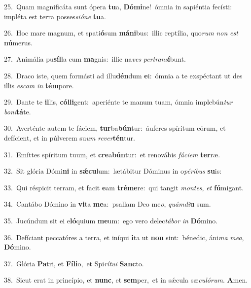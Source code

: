 {\numbfont\textcolor{\numbcolor}{25.}}~Quam magnificáta sunt ópera \textbf{tu}\-a, \textbf{Dó}\-\textbf{mi}ne!~\star ómnia in sapiéntia fecísti: impléta est terra posses\-\textit{si}\-\textit{ó}\textit{ne} \textbf{tu}\-a.\par
{\numbfont\textcolor{\numbcolor}{26.}}~Hoc mare magnum, et spati\-\textbf{ó}\-sum \textbf{má}\-\textbf{ni}bus:~\star illic reptília, quo\textit{rum} \textit{non} \textit{est} \textbf{nú}\-merus.\par
{\numbfont\textcolor{\numbcolor}{27.}}~Animália pu\-\textbf{síl}\-la cum \textbf{ma}\-gnis:~\star illic na\textit{ves} \textit{per}\-\textit{trans}\textbf{í}bunt.\par
{\numbfont\textcolor{\numbcolor}{28.}}~Draco iste, quem formásti ad illu\-\textbf{dén}\-dum \textbf{e}\-i:~\star ómnia a te exspéctant ut des illis \textit{es}\-\textit{cam} \textit{in} \textbf{tém}\-pore.\par
{\numbfont\textcolor{\numbcolor}{29.}}~Dante te \textbf{il}\-lis, \textbf{cól}\-\textbf{li}gent:~\star aperiénte te manum tuam, ómnia implebún\textit{tur} \textit{bo}\-\textit{ni}\textbf{tá}te.\par
{\numbfont\textcolor{\numbcolor}{30.}}~Averténte autem te fáciem, \textbf{tur}\-ba\-\textbf{bún}\-tur:~\star áuferes spíritum eórum, et defícient, et in púlverem su\textit{um} \textit{re}\-\textit{ver}\textbf{tén}tur.\par
{\numbfont\textcolor{\numbcolor}{31.}}~Emíttes spíritum tuum, et \textbf{cre}\-a\-\textbf{bún}\-tur:~\star et renovábis \textit{fá}\-\textit{ci}\textit{em} \textbf{ter}\-ræ.\par
{\numbfont\textcolor{\numbcolor}{32.}}~Sit glória Dómi\textbf{ni} in \textbf{sǽ}\-\textbf{cu}lum:~\star lætábitur Dóminus in o\-\textit{pé}\-\textit{ri}\textit{bus} \textbf{su}\-is:\par
{\numbfont\textcolor{\numbcolor}{33.}}~Qui réspicit terram, et facit \textbf{e}\-am \textbf{tré}\-\textbf{me}re:~\star qui tangit \textit{mon}\-\textit{tes}, \textit{et} \textbf{fú}\-migant.\par
{\numbfont\textcolor{\numbcolor}{34.}}~Cantábo Dómino in \textbf{vi}\-ta \textbf{me}\-a:~\star psallam Deo me\-\textit{o}\-, \textit{quám}\-\textit{di}\textbf{u} sum.\par
{\numbfont\textcolor{\numbcolor}{35.}}~Jucúndum sit ei e\-\textbf{ló}\-quium \textbf{me}\-um:~\star ego vero delec\-\textit{tá}\-\textit{bor} \textit{in} \textbf{Dó}\-mino.\par
{\numbfont\textcolor{\numbcolor}{36.}}~Defíciant peccatóres a terra, et iníqui \textbf{i}\-ta ut \textbf{non} sint:~\star bénedic, áni\textit{ma} \textit{me}\-\textit{a}, \textbf{Dó}\-mino.\par
{\numbfont\textcolor{\numbcolor}{37.}}~Glória \textbf{Pa}\-tri, et \textbf{Fí}\-\textbf{li}o,~\star et Spi\-\textit{rí}\-\textit{tu}\textit{i} \textbf{Sanc}\-to.\par
{\numbfont\textcolor{\numbcolor}{38.}}~Sicut erat in princípio, et \textbf{nunc}\-, et \textbf{sem}\-per,~\star et in sǽcula sæ\-\textit{cu}\-\textit{ló}\textit{rum}. \textbf{A}\-men.\par
